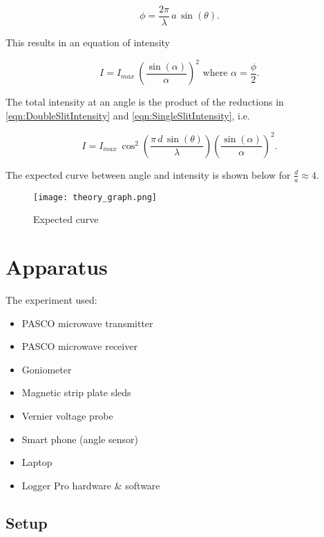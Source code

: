 \begin{equation}
	\label{eqn:SingleSlitPhase}
	\phi = \frac{2 \pi}{\lambda} \, a \, \sin(\theta).
\end{equation}


This results in an equation of intensity

\begin{equation}
	\label{eqn:SingleSlitIntensity}
	I = I_{max} ~ \left( \frac{\sin({\alpha})}{\alpha} \right)^2 \text{ where } \alpha = \frac{\phi}{2}.
\end{equation}

The total intensity at an angle is the product of the reductions in \eqref{eqn:DoubleSlitIntensity} and \eqref{eqn:SingleSlitIntensity}, i.e. 

\begin{equation}
	\label{eqn:Intensity}
I = I_{max} ~ \cos^2{\left(\frac{\pi \, d \, \sin(\theta)}{\lambda}\right)} \left( \frac{\sin({\alpha})}{\alpha} \right)^2.
\end{equation}

The expected curve between angle and intensity is shown below for $\frac{d}{a} \approx 4$.
\begin{figure}[h]
\centering
\texttt{[image: theory\_graph.png]}
\caption{Expected curve}
\label{fig:ExpectedCurve}
\end{figure}

\section*{Apparatus}

The experiment used:
\begin{itemize}
\item PASCO microwave transmitter
\item PASCO microwave receiver
\item Goniometer
\item Magnetic strip plate sleds
\item Vernier voltage probe
\item Smart phone (angle sensor)
\item Laptop
\item Logger Pro hardware \& software
\end{itemize}

\subsection*{Setup}

